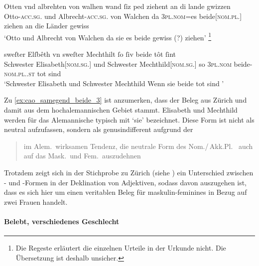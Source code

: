 \begin{exe}
\ex \label{ex:cao_samegend_beide}
\begin{xlist}

	\ex \label{ex:cao_samegend_beide_2}
		\gll Otten vnd albrehten von walhen \textelp{} wand
			ſiz ped ziehent an di lande gwizzen \\
			Otto-\textsc{acc.sg.\MascM} und Albrecht-\textsc{acc.sg.\MascM} von Walchen
			{} da \textsc{3pl\subM.nom}=es beide[\textsc{nom.pl.\MascM}] ziehen an die
			Länder gewiss \\
		\trans `Otto und Albrecht von Walchen \textelp{} da sie es beide
			gewiss (?)  ziehen'%
			\footnote{Die Regeste \autocite[80]{caor} erläutert die einzelnen
			Urteile in der Urkunde nicht. Die Übersetzung ist deshalb
			unsicher.}
			\parencites(Nr. 491, Salzburg, 1281)[431,41 und 432.38]{cao1}

	\ex \label{ex:cao_samegend_beide_3}
		\gll sweſter Elſbêth vn sweſter Mechthilt \textelp{} ſo
			ſiv beide tôt ſint~\textelp{} \\
			Schwester Elisabeth[\textsc{nom.sg.\FemF}] und Schwester
			Mechthild[\textsc{nom.sg.\FemF}] {} so \textsc{3pl\subF.nom}
			beide-\textsc{nom.pl.\FemF.st} tot sind \\
		\trans `Schwester Elisabeth und Schwester Mechthild \textelp{}
			Wenn sie beide tot sind \textelp{}'
			\parencites(Nr.~1504, Zürich, 1291)[679,12--13]{cao2}
\end{xlist}
\end{exe}

Zu \cref{ex:cao_samegend_beide_3} ist anzumerken, dass der Beleg aus Zürich und
damit aus dem hochalemannischen Gebiet stammt. Elisabeth und Mechthild werden
für das Alemannische typisch mit  `sie' bezeichnet. Diese Form
ist nicht als neutral aufzufassen, sondern als genusindifferent aufgrund der
\blockcquote[395]{ksw2}{im Alem.\ wirksamen Tendenz, die neutrale Form
 des Nom./\,Akk.Pl.\ \textelp{} auch auf das Mask.\ und Fem.\
auszudehnen}. Trotzdem zeigt sich in der Stichprobe zu Zürich (siehe
\sectref{par:adjzuerich}) ein Unterschied zwischen \norm{e}- und
\norm{iu}-Formen in der Deklination von Adjektiven, sodass davon auszugehen
ist, dass es sich hier um einen veritablen Beleg für maskulin-feminines
\norm{bėide} in Bezug auf zwei Frauen handelt.

\paragraph{Belebt, verschiedenes Geschlecht}

